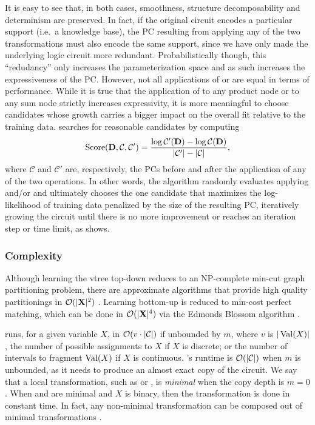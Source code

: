 It is easy to see that, in both cases, smoothness, structure decomposability and determinism are
preserved. In fact, if the original circuit encodes a particular support (i.e.\ a knowledge base),
the PC resulting from applying any of the two transformations must also encode the same support,
since we have only made the underlying logic circuit more redundant. Probabilistically though, this
``redudancy'' only increases the parameterization space and as such increases the expressiveness of
the PC. However, not all applications of  or  are equal in terms of
performance. While it is true that the application of  to any product node or
 to any sum node strictly increases expressivity, it is more meaningful to choose
candidates whose growth carries a bigger impact on the overall fit relative to the training data.
 searches for reasonable candidates by computing
\begin{equation}
  \operatorname{\normalfont{Score}}(\mathbf{D}, \mathcal{C}, \mathcal{C}')=\frac{\log\mathcal{C}'(\mathbf{D})-\log
  \mathcal{C}(\mathbf{D})}{|\mathcal{C}'|-|\mathcal{C}|},
\end{equation}
where $\mathcal{C}$ and $\mathcal{C}'$ are, respectively, the PCs before and after the application
of any of the two operations. In other words, the algorithm randomly evaluates applying
 and/or  and ultimately chooses the one candidate that maximizes
the log-likelihood of training data penalized by the size of the resulting PC, iteratively growing
the circuit until there is no more improvement or reaches an iteration step or time limit, as
 shows.

\subsubsection{Complexity}

Although learning the vtree top-down reduces to an NP-complete min-cut graph partitioning problem,
there are approximate algorithms that provide high quality partitionings in $\mathcal{O}(|\mathbf{X}|^2)$
\citep{karypsis98}. Learning bottom-up is reduced to min-cost perfect matching, which can be done
in $\mathcal{O}(|\mathbf{X}|^4)$ via the Edmonds Blossom algorithm \citep{edmonds65,kolmogorov09}.

 runs, for a given variable $X$, in $\mathcal{O}(v\cdot|\mathcal{C}|)$ if unbounded
by $m$, where $v$ is $|\operatorname*{\normalfont{Val}}(X)|$, the number of possible assignments to $X$ if $X$ is discrete; or
the number of intervals to fragment $\operatorname*{\normalfont{Val}}(X)$ if $X$ is continuous. 's runtime is
$\mathcal{O}(|\mathcal{C}|)$ when $m$ is unbounded, as it needs to produce an almost exact copy of
the circuit. We say that a local transformation, such as  or , is
\emph{minimal} when the copy depth is $m=0$. When  and  are minimal
and $X$ is binary, then the transformation is done in constant time. In fact, any non-minimal
transformation can be composed out of minimal transformations \citep{liang17}.

